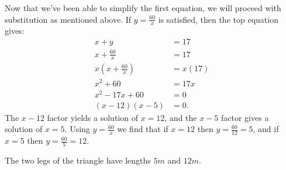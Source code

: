 \documentclass[nooutcomes]{ximera}
\begin{document}
\begin{exercise}
\begin{explanation}
			Now that we've been able to simplify the first equation, we will proceed with substitution as mentioned above. If $y =\frac{60}{x}$ is satisfied, then the top
			equation gives:
			\begin{align*}
				x + y &= 17\\
				x + \frac{60}{x} &= 17\\
				x\left( x + \frac{60}{x}\right) &= x(17)\\
				x^2 + 60 &= 17x\\
				x^2 - 17x + 60 &= 0\\
				(x-12)(x-5) &= 0.
			\end{align*}				
			The $x-12$ factor yields a solution of $x=12$, and the $x-5$ factor gives a solution of $x=5$. Using $y=\frac{60}{x}$ we find that if
			$x=12$ then $y = \frac{60}{12}=5$, and if $x=5$ then $y=\frac{60}{5} = 12$.
			
			The two legs of the triangle have lengths $5 m$ and $12 m$.
					
		\end{explanation}
	\end{exercise}
\end{document}
